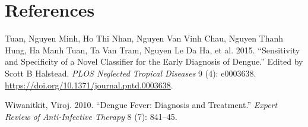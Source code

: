 \documentclass[
]{article}
\newlength{\cslhangindent}
\newlength{\cslentryspacingunit} %
\newenvironment{CSLReferences}[2] %
 {%
  \setlength{\parindent}{0pt}
  \ifodd #1
  \let\oldpar\par
  \def\par{\hangindent=\cslhangindent\oldpar}
  \fi
  \setlength{\parskip}{#2\cslentryspacingunit}
 }%
 {}
\begin{document}
\hypertarget{references}{%
\section*{References}\label{references}}

\hypertarget{refs}{}
\begin{CSLReferences}{1}{0}
\leavevmode{}%
Tuan, Nguyen Minh, Ho Thi Nhan, Nguyen Van Vinh Chau, Nguyen Thanh Hung,
Ha Manh Tuan, Ta Van Tram, Nguyen Le Da Ha, et al. 2015. {``Sensitivity
and Specificity of a Novel Classifier for the Early Diagnosis of
Dengue.''} Edited by Scott B Halstead. \emph{PLOS Neglected Tropical
Diseases} 9 (4): e0003638.
\url{https://doi.org/10.1371/journal.pntd.0003638}.

\leavevmode{}%
Wiwanitkit, Viroj. 2010. {``Dengue Fever: Diagnosis and Treatment.''}
\emph{Expert Review of Anti-Infective Therapy} 8 (7): 841--45.

\end{CSLReferences}
\end{document}
